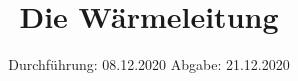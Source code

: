 

\subject{V204}
\title{Die Wärmeleitung}
\date{%
  Durchführung: 08.12.2020
  \hspace{3em}
  Abgabe: 21.12.2020
}



\maketitle
\thispagestyle{empty}
\tableofcontents
\newpage






\printbibliography{}



